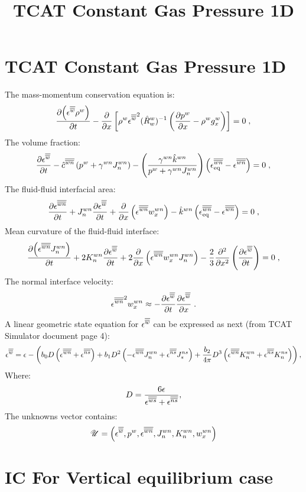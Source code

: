 \documentclass{article}
\title{TCAT Constant Gas Pressure 1D}
\begin{document}
\maketitle
\section{TCAT Constant Gas Pressure 1D}
The mass-momentum conservation equation is:
\begin{equation}
\pdt{\lrp{\ew \raw}}
-\pd{}x\lrb{\raw\ew^2 (\hsR^w_w)^{-1}
\lrp{\pd\paw x-\raw g_x^w}}
=0
\;,
\label{eq:TpMP1d}
\end{equation}
The volume fraction:
\begin{equation}
\pdt{\ew}
-\dbs{\hat c}\wn\lrp{\paw+\iftma\wn J_n^\wn}
-\lrp{\frac{\iftma\wn\hsk^\wn}{\paw+\iftma\wn J_n^\wn}}
  \lrp{\sdats\gke\wn{\rm{eq}}-\ewn}
=0\;,
\label{eq:swev}
\end{equation}
The fluid-fluid interfacial area: 
\begin{equation}
 \pdt\ewn
+J_n^\wn\pdt{\ew}
+\pd{}x\lrp{\ewn w_x^\wn} 
-\hsk^\wn\lrp{\sdats\gke\wn{\rm{eq}}-\ewn}
=0\;,
\label{eq:ewnev1d}
\end{equation}
Mean curvature of the fluid-fluid interface:
\begin{equation}
\pdt {\lrp{\ewn J_n^\wn}}
+2K_n^\wn \pdt\ew
+2\pd{}x\lrp{\ewn w_x^\wn J_n^\wn}
-\frac 23\pdn 2{}x\lrp{\pdt\ew}
=0\;,
\label{eq:TpJ1d}
\end{equation}
The normal interface velocity:
\begin{equation}
\ewn^2 w_x^\wn\approx
-\pdt\ew\pd \ew x\;.
\label{eq:Tp-w1d}
\end{equation}
A linear geometric state equation for \(\ew\) can be expressed as next (from TCAT Simulator document page 4):
\begin{equation}
\ew=\gke-\lrp{b_0{D}\lrp{\ewn+\ens}+b_1{D^2}\lrp{-\ewn{J_n^\wn}+\ens{J_s^\ns}}+\frac{b_2}{4\pi} {D^3}\lrp{\ewn{K_n^\wn}+\ens{K_n^\ns}}},
\label{eq:Tp-igeos-linear}
\end{equation}
Where:
\begin{equation}
D=\frac{6\gke}{\ews+\ens},
\label{eq:Tp-igeos-linear-D}
\end{equation}
The unknowns vector contains:
\begin{equation}
\set U = \lrp{\ew, \paw, \ewn, J_n^\wn, K_n^\wn, w_x^\wn} 
\label{eq:U_simplified}
\end{equation}
\section{IC For Vertical equilibrium case}
\end{document}
